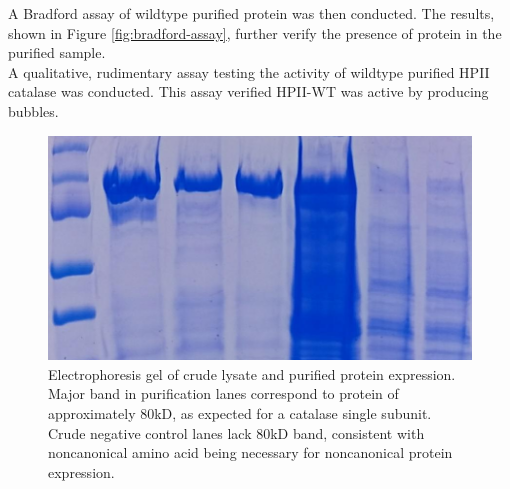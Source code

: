 \documentclass[journal=jacsat,manuscript=article]{achemso}
\begin{document}
A Bradford assay of wildtype purified protein was then conducted. The results, shown in Figure \ref{fig:bradford-assay}, further verify the presence of protein in the purified sample.\\

A qualitative, rudimentary assay testing the activity of wildtype purified HPII catalase was conducted. This assay verified HPII-WT was active by producing bubbles.\\

\begin{figure}
\centering
\includegraphics[width=0.7\linewidth]{figures/pure-gel}
\caption{Electrophoresis gel of crude lysate and purified protein expression. Major band in purification lanes correspond to protein of approximately 80kD, as expected for a catalase single subunit. Crude negative control lanes lack 80kD band, consistent with noncanonical amino acid being necessary for noncanonical protein expression.}
\label{fig:pure-gel}
\end{figure}
\end{document}
